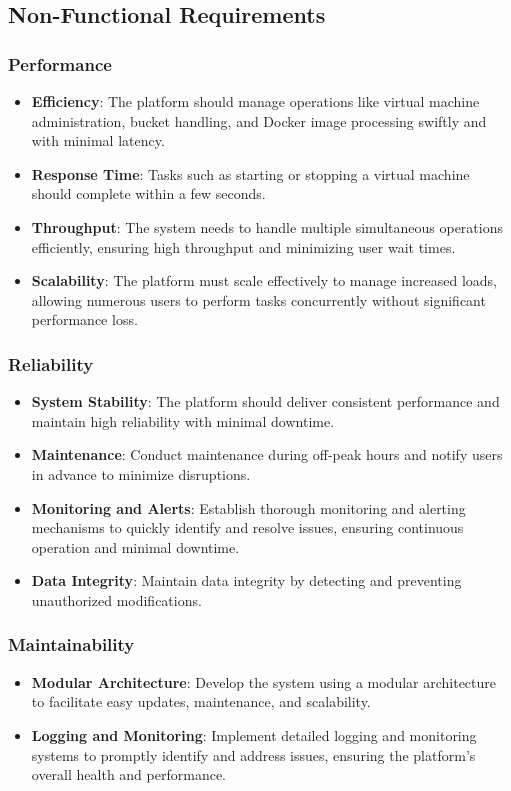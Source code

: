 \subsection{Non-Functional Requirements}

\subsubsection{Performance}
\begin{itemize}
    \item \textbf{Efficiency}: The platform should manage operations like virtual machine administration, bucket handling, and Docker image processing swiftly and with minimal latency.
    \item \textbf{Response Time}: Tasks such as starting or stopping a virtual machine should complete within a few seconds.
    \item \textbf{Throughput}: The system needs to handle multiple simultaneous operations efficiently, ensuring high throughput and minimizing user wait times.
    \item \textbf{Scalability}: The platform must scale effectively to manage increased loads, allowing numerous users to perform tasks concurrently without significant performance loss.
\end{itemize}

\subsubsection{Reliability}
\begin{itemize}
    \item \textbf{System Stability}: The platform should deliver consistent performance and maintain high reliability with minimal downtime.
    \item \textbf{Maintenance}: Conduct maintenance during off-peak hours and notify users in advance to minimize disruptions.
    \item \textbf{Monitoring and Alerts}: Establish thorough monitoring and alerting mechanisms to quickly identify and resolve issues, ensuring continuous operation and minimal downtime.
    \item \textbf{Data Integrity}: Maintain data integrity by detecting and preventing unauthorized modifications.
\end{itemize}

\subsubsection{Maintainability}
\begin{itemize}
    \item \textbf{Modular Architecture}: Develop the system using a modular architecture to facilitate easy updates, maintenance, and scalability.
    \item \textbf{Logging and Monitoring}: Implement detailed logging and monitoring systems to promptly identify and address issues, ensuring the platform's overall health and performance.
\end{itemize}


